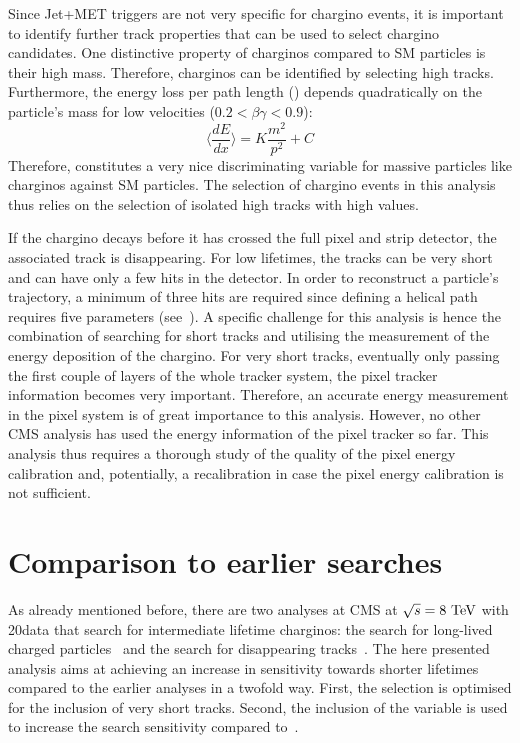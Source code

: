Since Jet+MET triggers are not very specific for chargino events, it is important to identify further track properties that can be used to select chargino candidates.
One distinctive property of charginos compared to SM particles is their high mass. 
Therefore, charginos can be identified by selecting high \pt tracks. 
Furthermore, the energy loss per path length (\dedx) depends quadratically on the particle's mass for low velocities ($0.2<\beta\gamma<0.9$):
\begin{equation}
\langle\frac{dE}{dx}\rangle = K \frac{m^2}{p^2} +C
\end{equation}
Therefore, \dedx constitutes a very nice discriminating variable for massive particles like charginos against SM particles.
The selection of chargino events in this analysis thus relies on the selection of isolated high \pt tracks with high \dedx values. 

If the chargino decays before it has crossed the full pixel and strip detector, the associated track is disappearing. 
For low lifetimes, the tracks can be very short and can have only a few hits in the detector. 
In order to reconstruct a particle's trajectory, a minimum of three hits are required since defining a helical path requires five parameters (see~\cite{bib:CMS:tracking_8TeV}). 
A specific challenge for this analysis is hence the combination of searching for short tracks and utilising the measurement of the energy deposition of the chargino. 
For very short tracks, eventually only passing the first couple of layers of the whole tracker system, the pixel tracker information becomes very important. 
Therefore, an accurate energy measurement in the pixel system is of great importance to this analysis. 
However, no other CMS analysis has used the energy information of the pixel tracker so far.
This analysis thus requires a thorough study of the quality of the pixel energy calibration and, potentially, a recalibration in case the pixel energy calibration is not sufficient.



\section{Comparison to earlier searches}
As already mentioned before, there are two analyses at CMS at $\sqrt{s}=8\,\,\text{Te}\kern-0.06667em\text{V}$ with 20\fbinv data that search for intermediate lifetime charginos: the search for long-lived charged particles~\cite{bib:CMS:HSCP_8TeV} and the search for disappearing tracks~\cite{bib:CMS:DT_8TeV}.
The here presented analysis aims at achieving an increase in sensitivity towards shorter lifetimes compared to the earlier analyses in a twofold way.
First, the selection is optimised for the inclusion of very short tracks.
Second, the inclusion of the variable \dedx is used to increase the search sensitivity compared to~\cite{bib:CMS:DT_8TeV}.\\

